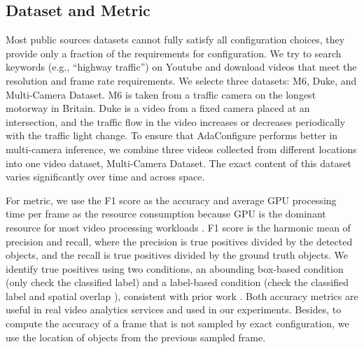 \subsection{Dataset and Metric}
\label{subsec: datasets}
Most public sources datasets cannot fully satisfy all configuration choices, they provide only a fraction of the requirements for configuration. %
We try to search keywords (e.g., ``highway traffic'') on Youtube and download videos that meet the resolution and frame rate requirements. We selecte three datasets: M6, Duke, and Multi-Camera Dataset. M6 is taken from a traffic camera on the longest motorway in Britain. Duke is a video from a fixed camera placed at an intersection, and the traffic flow in the video increases or decreases periodically with the traffic light change. 
To ensure that AdaConfigure performs better in multi-camera inference, we combine three videos collected from different locations into one video dataset, Multi-Camera Dataset. The exact content of this dataset varies significantly over time and across space.

For metric, we use the F1 score as the accuracy and average GPU processing time per frame as the resource consumption because GPU is the dominant resource for most video processing workloads \cite{jiang2018chameleon}. F1 score is the harmonic mean of precision and recall, where the precision is true positives divided by the detected objects, and the recall is true positives divided by the ground truth objects. We identify true positives using two conditions, an abounding box-based condition (only check the classified label) and a label-based condition (check the classified label and spatial overlap \cite{overlap}), consistent with prior work \cite{jiang2018chameleon,noscope}. Both accuracy metrics are useful in real video analytics services and used in our experiments. Besides, to compute the accuracy of a frame that is not sampled by exact configuration, we use the location of objects from the previous sampled frame. 

